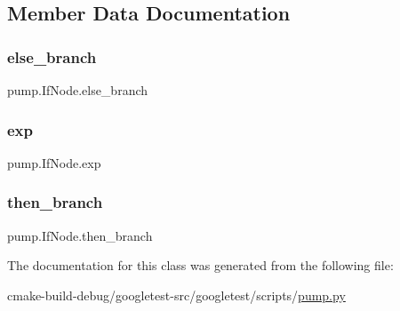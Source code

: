 \subsection{Member Data Documentation}
\mbox{\label{classpump_1_1IfNode_a12e422b16ed4291f15cd95cd6e7f81eb}} 
\subsubsection{\texorpdfstring{else\_branch}{else\_branch}}
{\footnotesize\ttfamily pump.\+If\+Node.\+else\+\_\+branch}

\mbox{\label{classpump_1_1IfNode_a92042e4262196ffd7366350539f512d8}} 
\subsubsection{\texorpdfstring{exp}{exp}}
{\footnotesize\ttfamily pump.\+If\+Node.\+exp}

\mbox{\label{classpump_1_1IfNode_aa9e2e488564629f8dc0d64d165a19ffa}} 
\subsubsection{\texorpdfstring{then\_branch}{then\_branch}}
{\footnotesize\ttfamily pump.\+If\+Node.\+then\+\_\+branch}



The documentation for this class was generated from the following file\+:\begin{DoxyCompactItemize}
\item 
cmake-\/build-\/debug/googletest-\/src/googletest/scripts/\mbox{\hyperlink{pump_8py}{pump.\+py}}\end{DoxyCompactItemize}
